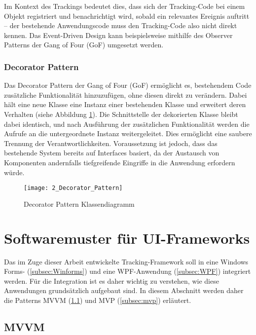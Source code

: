 Im Kontext des Trackings bedeutet dies, dass sich der Tracking-Code bei einem Objekt registriert und benachrichtigt wird, sobald ein relevantes Ereignis auftritt – der bestehende Anwendungscode muss den Tracking-Code also nicht direkt kennen. Das Event-Driven Design kann beispielsweise mithilfe des Observer Patterns der Gang of Four (GoF) \cite{gamma1995design} umgesetzt werden.

\subsubsection{Decorator Pattern}
\label{subsubsec:decorator_pattern}
Das Decorator Pattern der Gang of Four (GoF) \cite{gamma1995design} ermöglicht es, bestehendem Code zusätzliche Funktionalität hinzuzufügen, ohne diesen direkt zu verändern.  
Dabei hält eine neue Klasse eine Instanz einer bestehenden Klasse und erweitert deren Verhalten (siehe Abbildung \ref{fig:decorator_pattern}). 
Die Schnittstelle der dekorierten Klasse bleibt dabei identisch, und nach Ausführung der zusätzlichen Funktionalität werden die Aufrufe an die untergeordnete Instanz weitergeleitet. Dies ermöglicht eine saubere Trennung der Verantwortlichkeiten. Voraussetzung ist jedoch, dass das bestehende System bereits auf Interfaces basiert, da der Austausch von Komponenten andernfalls tiefgreifende Eingriffe in die Anwendung erfordern würde.

\begin{figure}[H]
\centering
\texttt{[image: 2\_Decorator\_Pattern]}
\caption{Decorator Pattern Klassendiagramm}
\label{fig:decorator_pattern}
\end{figure}

\section{Softwaremuster für UI-Frameworks}
\label{subsec:patterns}

Das im Zuge dieser Arbeit entwickelte Tracking-Framework soll in eine Windows Forms- (\ref{subsec:Winforms}) und eine WPF-Anwendung (\ref{subsec:WPF}) integriert werden. 
Für die Integration ist es daher wichtig zu verstehen, wie diese Anwendungen grundsätzlich aufgebaut sind. 
In diesem Abschnitt werden daher die Patterns MVVM (\ref{subsec:mvvm}) und MVP (\ref{subsec:mvp}) erläutert.

\subsection{MVVM}
\label{subsec:mvvm}

